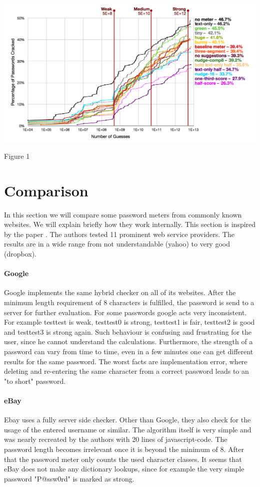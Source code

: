 \documentclass[12pt,a4paper]{article}
\begin{document}
\begin{center}
\includegraphics[height=8cm]{percentageOfPasswordsCracked}
Figure 1  \cite{measureUp}
\end{center}

\section{Comparison}
\label{sec:Comparison}
In this section we will compare some password meters from commonly known websites. We will explain briefly how they work internally. This section is inspired by the paper  \cite{weakToStrong}. 
The authors tested 11 prominent web service providers. The results are in a wide range from not understandable (yahoo) to very good (dropbox).

\paragraph{Google}
Google implements the same hybrid checker on all of its websites. After the minimum length requirement of 8 characters is fulfilled, the password is send to a server for further evaluation.
For some passwords google acts very inconsistent. For example testtest is weak, testtest0 is strong, testtest1 is fair, testtest2 is good and testtest3 is strong again. Such behaviour is confusing and frustrating for the user, since he cannot understand the calculations. Furthermore, the strength of a password can vary from time to time, even in a few minutes one can get different results for the same password.
The worst facts are implementation error, where deleting and re-entering the same character from a correct password leads to an "to short" password.

\paragraph{eBay}
Ebay uses a fully server side checker. Other than Google, they also check for the usage of the entered username or similar. The algorithm itself is very simple and was nearly recreated by the authors with 20 lines of javascript-code. The password length becomes irrelevant once it is beyond the minimum of 8. After that the password meter only counts the used character classes. It seems that eBay does not make any dictionary lookups, since for example the very simple password "P@ssw0rd" is marked as strong.
\end{document}
